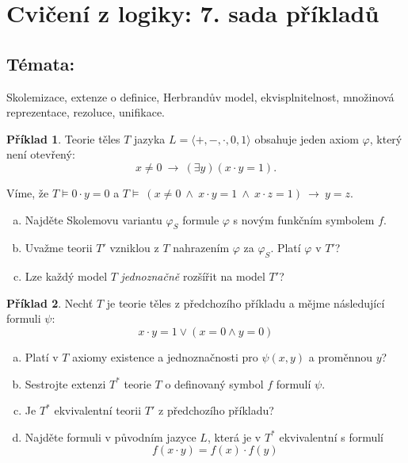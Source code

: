 \documentclass[11pt,a4paper]{amsart}
\theoremstyle{definition}
\newtheorem{problem}{Příklad}
\theoremstyle{remark}
\begin{document}
\section*{Cvičení z logiky: 7. sada příkladů}

\bigskip\bigskip

\subsection*{Témata:}  Skolemizace, extenze o definice, Herbrandův model, ekvisplnitelnost, množinová reprezentace, rezoluce, unifikace.

\bigskip\bigskip

\begin{problem} Teorie těles $T$ jazyka $L=\langle +,-,\cdot,0,1\rangle$ obsahuje jeden axiom $\varphi$, který není otevřený:
$$x\ne 0\ \to\ (\exists y)(x\cdot y=1).$$
\medskip

Víme, že $T\models 0\cdot y=0$ a $T\models\ (x\ne 0\ \wedge\ x\cdot y=1\ \wedge\ x\cdot z=1)\ \to\ y=z$.
\medskip
\begin{enumerate}[(a)]
\itemsep12pt
\item Najděte Skolemovu variantu $\varphi_S$ formule $\varphi$ s novým funkčním symbolem $f$.
\item Uvažme teorii $T'$ vzniklou z $T$ nahrazením $\varphi$ za $\varphi_S$. Platí $\varphi$ v $T'$?
\item Lze každý model $T$ \emph{jednoznačně} rozšířit na model $T'$?
\end{enumerate}
\end{problem}

\bigskip

\begin{problem} Nechť $T$ je teorie těles z předchozího příkladu a mějme následující formuli $\psi$: $$x\cdot y=1\vee  (x=0 \wedge y=0)$$
\begin{enumerate}[(a)]
\itemsep12pt
\item Platí v $T$ axiomy existence a jednoznačnosti pro $\psi(x,y)$ a proměnnou $y$?
\item Sestrojte extenzi $T^*$ teorie $T$ o definovaný symbol $f$ formulí $\psi$.
\item Je $T^*$ ekvivalentní teorii $T'$ z předchozího příkladu?
\item Najděte formuli v původním jazyce $L$, která je v $T^*$ ekvivalentní s formulí
$$f(x\cdot y)=f(x)\cdot f(y)$$
\end{enumerate}
\end{problem}
\end{document}
